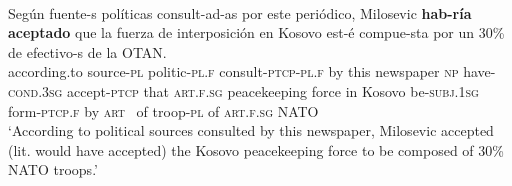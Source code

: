\documentclass[output=paper]{langsci/langscibook}
\begin{document}


\ea \label{ex:gq4}
	\\
	\gll Según fuente-s políticas consult-ad-as por este periódico, Milosevic \textbf{hab-ría} \textbf{aceptado} que la {fuerza de interposición} en Kosovo est-é compue-sta por un 30\% de efectivo-s de la OTAN.\\
	according.to source-\textsc{pl} politic-\textsc{pl.f} consult-\textsc{ptcp}-\textsc{pl.f} by this newspaper \textsc{np} have-\textsc{cond.3sg} accept-\textsc{ptcp} that \textsc{art.f.sg} {peacekeeping force} in Kosovo be-\textsc{subj.1sg} form-\textsc{ptcp.f} by \textsc{art} {} of troop-\textsc{pl} of \textsc{art.f.sg} NATO \\
	\glt ‘According to political sources consulted by this newspaper, Milosevic accepted (lit. would have accepted) the Kosovo peacekeeping force to be composed of 30\% NATO troops.’
\z
\end{document}
